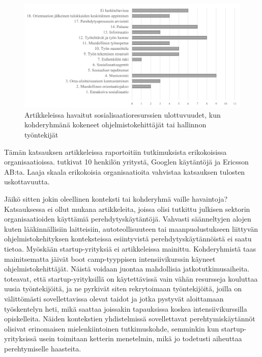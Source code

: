 \documentclass[utf8]{gradu3}
\begin{document}
\begin{figure}[h]
    \centering
    \includegraphics[width=\textwidth]{media/ulottuvuudet_kohderyhmat_kokeneet_tai_hallinto.png}
    \caption{Artikkeleissa havaitut sosialisaatioresurssien ulottuvuudet, kun kohderyhmänä kokeneet ohjelmistokehittäjät tai hallinnon työntekijät}
    \label{kuvio:ulottuvuudet_kohderyhmat_kokeneet_tai_hallinto}
\end{figure}

Tämän katsauksen artikkeleissa raportoitiin tutkimuksista erikokoisissa organisaatioissa. \textcite{viana-ym-2014} tutkivat 10 henkilön yritystä, \textcite{johnson-senges-2010} Googlen käytäntöjä ja \textcite{britto-ym-2020} Ericsson AB:ta. Laaja skaala erikokoisia organisaatioita vahvistaa katsauksen tulosten uskottavuutta.

Jäikö sitten jokin oleellinen konteksti tai kohderyhmä vaille havaintoja? Katsauksessa ei ollut mukana artikkeleita, joissa olisi tutkittu julkisen sektorin organisaatioiden käyttämiä perehdytyskäytäntöjä. Vahvasti säänneltyjen alojen kuten lääkinnällisiin laitteisiin, autoteollisuuteen tai maanpuolustukseen liittyvän ohjelmistokehityksen konteksteissa esiintyvistä perehdytyskäytännöistä ei saatu tietoa. Myöskään startup-yrityksiä ei artikkeleissa mainittu. Kohderyhmistä taas mainitsematta jäivät boot camp-tyyppisen intensiivikurssin käyneet ohjelmistokehittäjät. Näistä voidaan juontaa mahdollisia jatkotutkimusaiheita. \textcite{lyon-green-2021} toteavat, että startup-yrityksillä on käytettävissä vain vähän resursseja kouluttaa uusia työntekijöitä,  ja ne pyrkivät siten rekrytoimaan työntekijöitä, joilla on välittömästi sovellettavissa olevat taidot ja jotka pystyvät aloittamaan työskentelyn heti, mikä saattaa joissakin tapauksissa koskea intensiivikurssilla opiskelleita. Näiden kontekstien yhdistelmissä sovellettavat perehtymiskäytännöt olisivat erinomaisen mielenkiintoinen tutkimuskohde, semminkin kun startup-yrityksissä usein toimitaan ketterin menetelmin, mikä jo todetusti aiheuttaa perehtymiselle haasteita.
\end{document}
